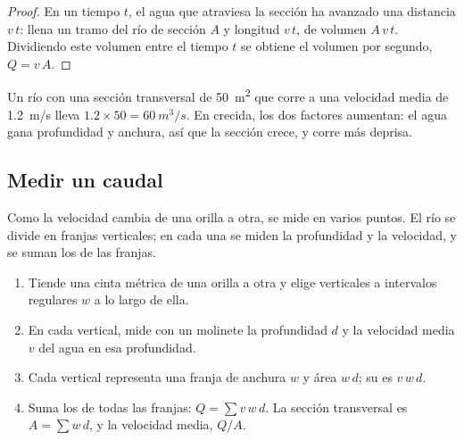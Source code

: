 \begin{proof}
En un tiempo $t$, el agua que atraviesa la sección ha avanzado una
distancia $v\,t$: llena un tramo del río de sección $A$ y
longitud $v\,t$, de volumen $A\,v\,t$. Dividiendo este volumen entre el tiempo $t$
se obtiene el volumen por segundo, $Q = v\,A$.
\end{proof}

Un río con una sección transversal de \qty{50}{m^2} que corre a una velocidad
media de \qty{1.2}{m/s} lleva $1.2 \times 50 = \qty{60}{m^3/s}$. En crecida,
los dos factores aumentan: el agua gana profundidad y anchura, así que la
sección crece, y corre más deprisa.

\subsection*{Medir un caudal}

Como la velocidad cambia de una orilla a otra, se mide en varios puntos. El
río se divide en franjas verticales; en cada una se miden la profundidad y la
velocidad, y se suman los  de las franjas.

\begin{method}\label{met:g10:drainage-basins:velocity-area}
\begin{enumerate}
  \item Tiende una cinta métrica de una orilla a otra y elige verticales a
        intervalos regulares $w$ a lo largo de ella.
  \item En cada vertical, mide con un molinete la profundidad $d$ y la
        velocidad media $v$ del agua en esa profundidad.
  \item Cada vertical representa una franja de anchura $w$ y área $w\,d$; su
         es $v\,w\,d$.
  \item Suma los  de todas las franjas: $Q = \sum v\,w\,d$.
        La sección transversal es $A = \sum w\,d$, y la velocidad media, $Q/A$.
\end{enumerate}
\end{method}

